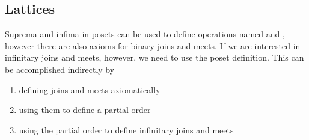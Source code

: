 \subsection{Lattices}\label{subsec:lattices}

\begin{remark}\label{remark:infinite_join_meet}
  Suprema and infima in posets can be used to define operations named  and , however there are also axioms for binary joins and meets. If we are interested in infinitary joins and meets, however, we need to use the poset definition. This can be accomplished indirectly by
  \begin{enumerate}
    \item defining joins and meets axiomatically
    \item using them to define a partial order
    \item using the partial order to define infinitary joins and meets
  \end{enumerate}
\end{remark}

